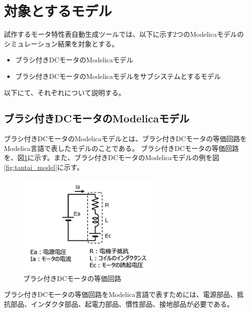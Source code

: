 \section{対象とするモデル}\label{taioumodel}
試作するモータ特性表自動生成ツールでは、以下に示す2つのModelicaモデルのシミュレーション結果を対象とする。
\begin{itemize}
	\item ブラシ付きDCモータのModelicaモデル
	\item ブラシ付きDCモータのModelicaモデルをサブシステムとするモデル
\end{itemize}

以下にて、それぞれについて説明する。
\subsection{ブラシ付きDCモータのModelicaモデル}\label{sub:tanntai}
ブラシ付きDCモータのModelicaモデルとは、ブラシ付きDCモータの等価回路\cite{等価回路}をModelica言語で表したモデルのことである。
ブラシ付きDCモータの等価回路を、図\ref{fig:touka}に示す。また、ブラシ付きDCモータのModelicaモデルの例を図\ref{fig:tantai_model}に示す。
\begin{figure}[t]
	\centering
	\includegraphics[width=7cm]{./Image/touka.png}
	\caption{ブラシ付きDCモータの等価回路}
	\label{fig:touka}
  \end{figure}
ブラシ付きDCモータの等価回路をModelica言語で表すためには、電源部品、抵抗部品、インダクタ部品、起電力部品、慣性部品、接地部品が必要である。

